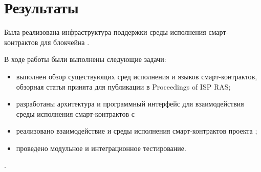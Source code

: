\section{Результаты}
Была реализована инфраструктура поддержки среды исполнения смарт-контрактов для блокчейна .

В ходе работы были выполнены следующие задачи:
\begin{itemize}
    \item выполнен обзор существующих сред исполнения и языков смарт-контрактов, обзорная статья принята для публикации в Pro\-ceed\-ings of ISP RAS;
    \item разработаны архитектура и программный интерфейс для взаимодействия среды исполнения смарт-контрактов с 
    \item реализовано взаимодействие  и среды исполнения смарт-контрактов проекта ;
    \item проведено модульное и интеграционное тестирование.
\end{itemize}
.

